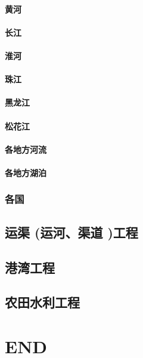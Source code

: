 \documentclass[UTF8]{../../ApplicationUniverse}
\begin{document}
        \subsubsection{黄河}
        \subsubsection{长江}
        \subsubsection{淮河}
        \subsubsection{珠江}
        \subsubsection{黑龙江}
        \subsubsection{松花江}
        \subsubsection{各地方河流}
        \subsubsection{各地方湖泊}
    \subsection{各国}
\section{运渠 (运河、渠道 )工程}
\section{港湾工程}
\section{农田水利工程}



\chapter{END}
\end{document}
